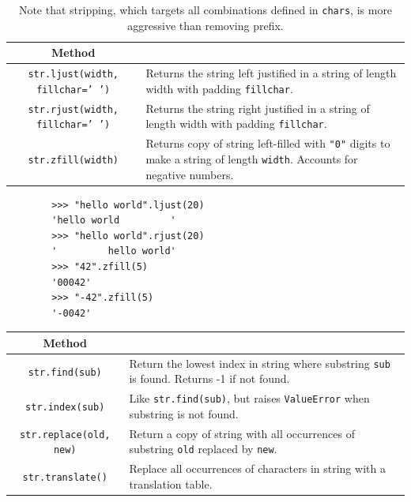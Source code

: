     \begin{definition}
      \label{def:justify-and-filling}
      \begin{table}[H]
        \centering
        \begin{tabular}{|c|p{8cm}|}
          \hline
          \textbf{Method} & \textbf{} \\
          \hline
          \texttt{str.ljust(width, fillchar=' ')} & Returns the string left justified in a string of length width with padding \texttt{fillchar}. \\ 
          \texttt{str.rjust(width, fillchar=' ')} & Returns the string right justified in a string of length width with padding \texttt{fillchar}. \\  
          \texttt{str.zfill(width)} & Returns copy of string left-filled with \texttt{"0"} digits to make a string of length \texttt{width}. Accounts for negative numbers. \\ 
          \hline
        \end{tabular}
        \caption{Note that stripping, which targets all combinations defined in \texttt{chars}, is more aggressive than removing prefix. }
      \end{table}
      \begin{lstlisting} 
        >>> "hello world".ljust(20)
        'hello world         '
        >>> "hello world".rjust(20)
        '         hello world'
        >>> "42".zfill(5)
        '00042'
        >>> "-42".zfill(5)
        '-0042'
      \end{lstlisting}
    \end{definition} 

    \begin{definition}
      \label{def:find-index-and-replace}
      \begin{table}[H]
        \centering
        \begin{tabular}{|c|p{8cm}|}
          \hline
          \textbf{Method} & \textbf{} \\
          \hline
          \texttt{str.find(sub)} & Return the lowest index in string where substring \texttt{sub} is found. Returns -1 if not found. \\  
          \texttt{str.index(sub)} & Like \texttt{str.find(sub)}, but raises \texttt{ValueError} when substring is not found. \\ 
          \texttt{str.replace(old, new)} & Return a copy of string with all occurrences of substring \texttt{old} replaced by \texttt{new}. \\ 
          \texttt{str.translate()} & Replace all occurrences of characters in string with a translation table. \\ 
          \hline
        \end{tabular}
      \end{table}
    \end{definition}

